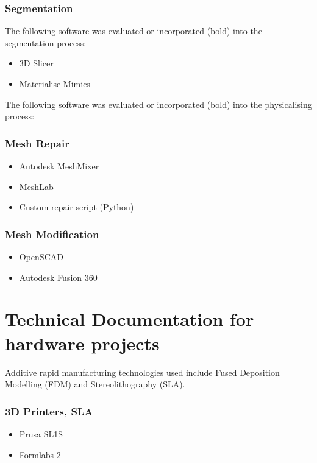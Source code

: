 \documentclass[MME,Projekt,english]{twbook}%
\begin{document}
\subsubsection{Segmentation}
The following software was evaluated or incorporated (bold) into the segmentation process:

\begin{itemize}
	\item 3D Slicer
	\item Materialise Mimics
\end{itemize}
The following software was evaluated or incorporated (bold) into the physicalising process:

\subsubsection{Mesh Repair}

\begin{itemize}
	\item Autodesk MeshMixer
	\item MeshLab
	\item Custom repair script (Python)
\end{itemize}

\subsubsection{Mesh Modification}

\begin{itemize}
	\item OpenSCAD
	\item Autodesk Fusion 360
\end{itemize}

\section{Technical Documentation for hardware projects}

Additive rapid manufacturing technologies used include Fused Deposition Modelling (FDM) and Stereolithography (SLA).

\subsubsection{3D Printers, SLA}

\begin{itemize}
	\item Prusa SL1S
	\item Formlabs 2
\end{itemize}
\end{document}
